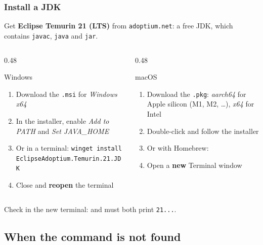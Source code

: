 \documentclass[aspectratio=169,10pt,compress]{beamer}
\newcommand{\cmd}[1]{\texttt{\color{gitred}#1}}
\begin{document}
\begin{frame}[t,fragile] \frametitle{Install a JDK}
  \small Get \textbf{Eclipse Temurin 21 (LTS)} from \texttt{adoptium.net}: a free JDK, which contains \texttt{javac}, \texttt{java} and \texttt{jar}.
  \begin{columns}[T]
    \begin{column}{0.48\textwidth}
      \begin{block}{Windows}
        \footnotesize
        \begin{enumerate}
          \item Download the \texttt{.msi} for \emph{Windows x64}
          \item In the installer, enable \emph{Add to PATH} and \emph{Set JAVA\_HOME}
          \item Or in a terminal: \cmd{winget install EclipseAdoptium.Temurin.21.JDK}
          \item Close and \textbf{reopen} the terminal
        \end{enumerate}
      \end{block}
    \end{column}
    \begin{column}{0.48\textwidth}
      \begin{block}{macOS}
        \footnotesize
        \begin{enumerate}
          \item Download the \texttt{.pkg}: \emph{aarch64} for Apple silicon (M1, M2, \dots), \emph{x64} for Intel
          \item Double-click and follow the installer
          \item Or with Homebrew: 
          \item Open a \textbf{new} Terminal window
        \end{enumerate}
      \end{block}
    \end{column}
  \end{columns}
  \small Check in the new terminal:  and  must both print \texttt{21...}.
\end{frame}




\subsection[PATH]{When the command is not found}
\end{document}
